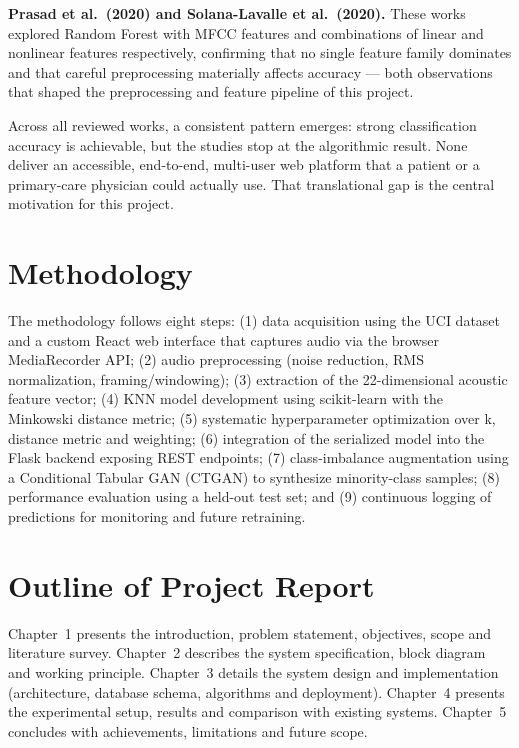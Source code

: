 \documentclass[oneside,a4paper,12pt]{report}
\begin{document}
\textbf{Prasad et al.\ (2020) and Solana-Lavalle et al.\ (2020).} These works
explored Random Forest with MFCC features and combinations of linear and nonlinear
features respectively, confirming that no single feature family dominates and that
careful preprocessing materially affects accuracy --- both observations that
shaped the preprocessing and feature pipeline of this project.

Across all reviewed works, a consistent pattern emerges: strong classification
accuracy is achievable, but the studies stop at the algorithmic result. None
deliver an accessible, end-to-end, multi-user web platform that a patient or a
primary-care physician could actually use. That translational gap is the central
motivation for this project.

\section{Methodology}
The methodology follows eight steps: (1) data acquisition using the UCI dataset
and a custom React web interface that captures audio via the browser
MediaRecorder API; (2) audio preprocessing (noise reduction, RMS normalization,
framing/windowing); (3) extraction of the 22-dimensional acoustic feature vector;
(4) KNN model development using scikit-learn with the Minkowski distance metric;
(5) systematic hyperparameter optimization over k, distance metric and weighting;
(6) integration of the serialized model into the Flask backend exposing REST
endpoints; (7) class-imbalance augmentation using a Conditional Tabular GAN
(CTGAN) to synthesize minority-class samples; (8) performance evaluation using a
held-out test set; and (9) continuous logging of predictions for monitoring and
future retraining.

\section{Outline of Project Report}
Chapter~1 presents the introduction, problem statement, objectives, scope and
literature survey. Chapter~2 describes the system specification, block diagram and
working principle. Chapter~3 details the system design and implementation
(architecture, database schema, algorithms and deployment). Chapter~4 presents the
experimental setup, results and comparison with existing systems. Chapter~5
concludes with achievements, limitations and future scope.

\end{document}
